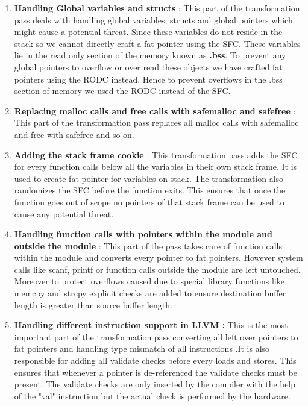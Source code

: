 \begin{enumerate}
    \item \textbf{Handling Global variables and structs} : This part of the transformation pass deals with handling global variables, structs and global pointers which might cause a potential threat. Since these variables do not reside in the stack so we cannot directly craft a fat pointer using the SFC. These variables lie in the read only section of the memory known as \textbf{.bss}. To prevent any global pointers to overflow or over read these objects we have crafted fat pointers using the RODC instead. Hence to prevent overflows in the .bss section of memory we used the RODC instead of the SFC.\\
    
    \item \textbf{Replacing malloc calls and free calls with safemalloc and safefree} : This part of the transformation pass replaces all malloc calls with safemalloc and free with safefree and so on.\\
    
    \item \textbf{Adding the stack frame cookie} : This transformation pass adds the SFC for every function calls below all the variables in their own stack frame. It is used to create fat pointer for variables on stack. The transformation also randomizes the SFC before the function exits. This ensures that once the function goes out of scope no pointers of that stack frame can be used to cause any potential threat. \\
    
    \item \textbf{Handling function calls with pointers within the module and outside the module} : This part of the pass takes care of function calls within the module and converts every pointer to fat pointers. However system calls like scanf, printf or function calls outside the module are left untouched. Moreover to protect overflows caused due to special library functions like memcpy and strcpy explicit checks are added to ensure destination buffer length is greater than source buffer length.  \\
    
    \item \textbf{Handling different instruction support in LLVM : } This is the most important part of the transformation pass converting all left over pointers to fat pointers and handling type mismatch of all instructions .It is also responsible for adding all validate checks before every loads and stores. This ensures that whenever a pointer is de-referenced the validate checks must be present. The validate checks are only inserted by the compiler with the help of the "val" instruction but the actual check is performed by the hardware.
\end{enumerate}


